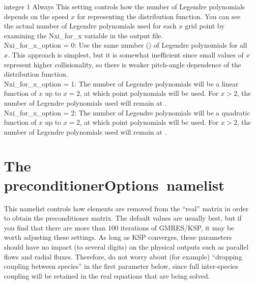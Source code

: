 {integer}
{1}
{Always}
{This setting controls how the number of Legendre polynomials depends on the speed $x$ for representing the distribution function.
You can see the actual number of Legendre polynomials used for each $x$ grid point by examining the {\ttfamily Nxi\_for\_x} variable
in the output file.\\

{\ttfamily Nxi\_for\_x\_option} = 0: Use the same number () of Legendre polynomials for all $x$.  This approach is
simplest, but it is somewhat inefficient since small values of $x$ represent higher collisionality, so there is weaker pitch-angle dependence
of the distribution function.\\

{\ttfamily Nxi\_for\_x\_option} = 1: The number of Legendre polynomials will be a linear function of $x$ up to $x=2$,
at which point  polynomials will be used. For $x>2$, the number of Legendre polynomials used will remain at .\\

{\ttfamily Nxi\_for\_x\_option} = 2: The number of Legendre polynomials will be a quadratic function of $x$ up to $x=2$,
at which point  polynomials will be used. For $x>2$, the number of Legendre polynomials used will remain at .\\

}









\section{The {\ttfamily preconditionerOptions}~namelist}

This namelist controls how elements are removed from the ``real'' matrix in order to obtain
the preconditioner matrix. The default values are usually best, but if you find that there are more than 100 iterations
of GMRES/KSP, it may be worth adjusting these settings.  As long as KSP converges, these parameters
should have no impact (to several digits) on the physical outputs such as parallel flows and radial fluxes.
Therefore, do not worry about (for example) ``dropping coupling between species'' in the first
parameter below, since full inter-species coupling will be retained in the real equations that are being solved.

